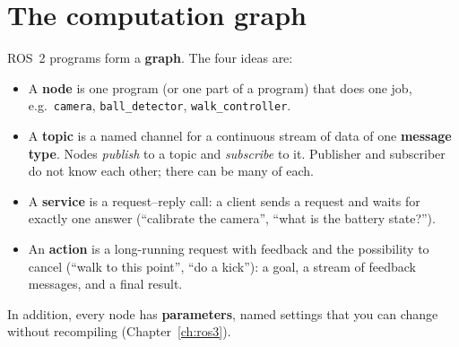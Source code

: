\section*{The computation graph}
ROS~2 programs form a \textbf{graph}. The four ideas are:
\begin{itemize}[nosep]
\item A \textbf{node} is one program (or one part of a program) that does one job, e.g.\ \verb!camera!, \verb!ball_detector!, \verb!walk_controller!.
\item A \textbf{topic} is a named channel for a continuous stream of data of one \textbf{message type}. Nodes \emph{publish} to a topic and \emph{subscribe} to it. Publisher and subscriber do not know each other; there can be many of each.
\item A \textbf{service} is a request--reply call: a client sends a request and waits for exactly one answer (``calibrate the camera'', ``what is the battery state?'').
\item An \textbf{action} is a long-running request with feedback and the possibility to cancel (``walk to this point'', ``do a kick''): a goal, a stream of feedback messages, and a final result.
\end{itemize}
In addition, every node has \textbf{parameters}, named settings that you can change without recompiling (Chapter~\ref{ch:ros3}).
\begin{center}
\label{fig:ros1_graph}
\end{center}
